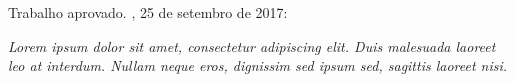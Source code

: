 \documentclass[
	12pt,				%
	openright,			%
	oneside,			%
	a4paper,			%
	english,			%
	french,				%
	spanish,			%
	brazil				%
	]{abntex2}
\begin{document}

% 

\begin{folhadeaprovacao}
  \begin{center}
    {\ABNTEXchapterfont\large\imprimirautor}
    \vspace*{\fill}\vspace*{\fill}
    \begin{center}
      \ABNTEXchapterfont\bfseries\Large\imprimirtitulo
    \end{center}
    \vspace*{\fill}
    \hspace{.45\textwidth}
    \begin{minipage}{.5\textwidth}
        \imprimirpreambulo
    \end{minipage}%
    \vspace*{\fill}
   \end{center}
   Trabalho aprovado. \imprimirlocal, 25 de setembro de 2017:
   \begin{center}
    \vspace*{0.5cm}
    {\large\imprimirlocal}
    \par
    {\large\imprimirdata}
    \vspace*{1cm}
  \end{center}  
\end{folhadeaprovacao}


\begin{dedicatoria}
   \vspace*{\fill}
   \centering
   \noindent
   \textit{Lorem ipsum dolor sit amet, consectetur adipiscing elit. Duis malesuada laoreet leo at interdum. Nullam neque eros, dignissim sed ipsum sed, sagittis laoreet nisi.} \vspace*{\fill}
\end{dedicatoria}
\end{document}
